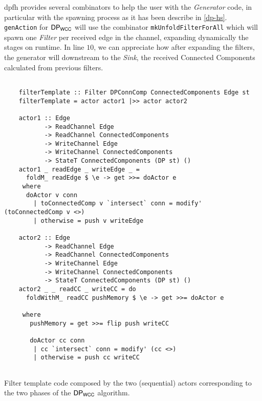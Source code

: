 \acrshort{dpfh} provides several combinators to help the user with the \textit{Generator} code, in particular with the spawning process as it has been describe in \autoref{dp-hs}.
\texttt{genAction} for $\mathsf{DP_{WCC}}$ will use the combinator \texttt{mkUnfoldFilterForAll} which will spawn one \textit{Filter} per received edge in the channel, expanding dynamically the stages on runtime.
In line $10$, we can appreciate how after expanding the filters, the generator will downstream to the \textit{Sink}, the received Connected Components calculated from previous filters.

\begin{listing}[H]
 \scriptsize{
  \begin{verbatim}
    
    filterTemplate :: Filter DPConnComp ConnectedComponents Edge st
    filterTemplate = actor actor1 |>> actor actor2
    
    actor1 :: Edge
           -> ReadChannel Edge
           -> ReadChannel ConnectedComponents
           -> WriteChannel Edge
           -> WriteChannel ConnectedComponents
           -> StateT ConnectedComponents (DP st) ()
    actor1 _ readEdge _ writeEdge _ = 
      foldM_ readEdge $ \e -> get >>= doActor e
     where
      doActor v conn
        | toConnectedComp v `intersect` conn = modify' (toConnectedComp v <>)
        | otherwise = push v writeEdge
    
    actor2 :: Edge
           -> ReadChannel Edge
           -> ReadChannel ConnectedComponents
           -> WriteChannel Edge
           -> WriteChannel ConnectedComponents
           -> StateT ConnectedComponents (DP st) ()
    actor2 _ _ readCC _ writeCC = do 
      foldWithM_ readCC pushMemory $ \e -> get >>= doActor e
    
     where
       pushMemory = get >>= flip push writeCC
    
       doActor cc conn
        | cc `intersect` conn = modify' (cc <>)
        | otherwise = push cc writeCC
    
  \end{verbatim}
  }
  \caption[{[\texttt{ConnectedComp.hs}] Filter Template Code}]{Filter template code composed by the two (sequential) actors corresponding to the two phases of the $\dpwcc$ algorithm.}
  \label{src:dpwcc:4}
\end{listing}

